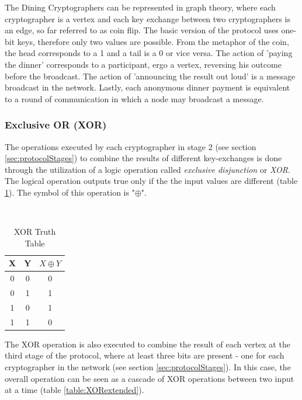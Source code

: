 The Dining Cryptographers can be represented in graph theory, where each cryptographer is a vertex and each key exchange between two cryptographers is an edge, so far referred to as coin flip. The basic version of the protocol uses one-bit keys, therefore only two values are possible. From the metaphor of the coin, the head corresponds to a 1 and a tail is a 0 or vice versa.
The action of 'paying the dinner' corresponds to a participant, ergo a vertex, reversing his outcome before the broadcast. The action of 'announcing the result out loud' is a message broadcast in the network. Lastly, each anonymous dinner payment is equivalent to a round of communication in which a node may broadcast a message.

\subsubsection{Exclusive OR (XOR)}
The operations executed by each cryptographer in stage 2 (see section \ref{sec:protocolStages}) to combine the results of different key-exchanges is done through the utilization of a logic operation called \textit{exclusive disjunction} or \textit{XOR}. The logical operation outputs true only if the the input values are different (table \ref{table:XOR}). The symbol of this operation is "$\oplus$".

\begin{table}[h!]
\centering
\caption{XOR Truth Table}
~\\[0.5ex]
\begin{tabular}{|| c | c | c ||} 
 \hline
 X & Y &  $X \oplus Y$ \\ [0.ex] 
 \hline\hline
 0 & 0 & 0 \\ 
 0 & 1 & 1 \\
 1 & 0 & 1 \\
 1 & 1 & 0 \\ [1ex]
 \hline
\end{tabular}
\label{table:XOR}
\end{table}

The XOR operation is also executed to combine the result of each vertex at the third stage of the protocol, where at least three bits are present - one for each cryptographer in the network (see section \ref{sec:protocolStages}). In this case, the overall operation can be seen as a cascade of XOR operations between two input at a time (table \ref{table:XORextended}).


